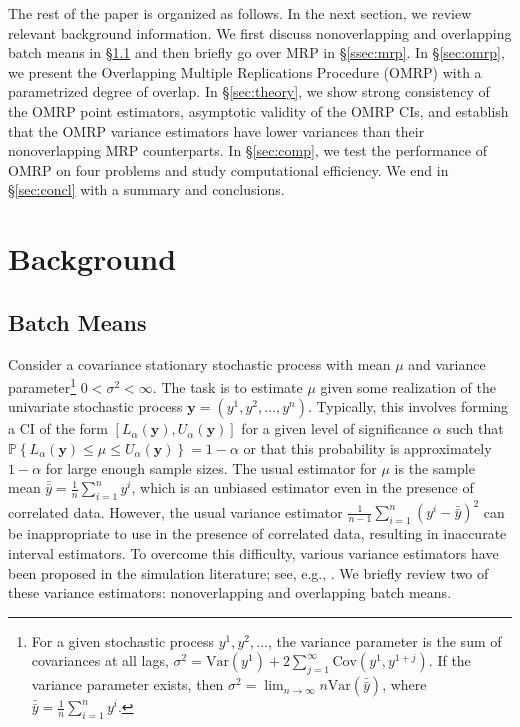 \documentclass[12pt]{article}
\newcommand{\p}[1]{\mathbb{P} \left\{ #1 \right\}}
\newcommand{\y}{\mathbf{y}}
\newcommand{\yb}{\bar{y}}
\newcommand{\ybb}{\bar{\yb}}
\begin{document}
The rest of the paper is organized as follows.  
In the next section, we review relevant background information.  
We first discuss nonoverlapping and overlapping batch means in \S \ref{ssec:obm} and then briefly go over MRP in \S \ref{ssec:mrp}.  
In \S \ref{sec:omrp}, we present the Overlapping Multiple Replications Procedure (OMRP) with a parametrized degree of overlap.  
In \S \ref{sec:theory}, we show strong consistency of the OMRP point estimators, asymptotic validity of the OMRP CIs, and establish that the OMRP variance estimators have lower variances than their nonoverlapping MRP counterparts.
In \S \ref{sec:comp}, we test the performance of OMRP on four problems and study computational efficiency. 
We end in \S \ref{sec:concl} with a summary and conclusions.


\section{Background}
\label{sec:background}


\subsection{Batch Means} 
\label{ssec:obm}

Consider a covariance stationary stochastic process with mean $\mu$ and variance parameter\footnote{For a given stochastic process $y^1, y^2, \dots$, the variance parameter is the sum of covariances at all lags, $\sigma^2=\mathrm{Var} \left(y^1 \right)+2\sum_{j=1}^{\infty}\mathrm{Cov} \left(y^1,y^{1+j}\right)$. If the variance parameter exists, then  $\sigma^2=\lim_{n\rightarrow \infty}n\mathrm{Var} \left(\ybb\right)$, where $\ybb=\frac{1}{n}\sum_{i=1}^{n} y^{i}$.} $0<\sigma^2<\infty$.  
The task is to estimate $\mu$ given some realization of the univariate stochastic process $\y = (y^1, y^2, \dots, y^n)$.  
Typically, this involves forming a CI of the form $[L_\alpha(\y), U_\alpha(\y)]$ for a given level of significance $\alpha$ such that $\p{L_\alpha(\y) \leq \mu \leq U_\alpha(\y)} = 1 - \alpha$ or that this probability is approximately $1 - \alpha$ for large enough sample sizes.  
The usual estimator for $\mu$ is the sample mean $\ybb = \frac{1}{n} \sum_{i=1}^n y^i$, which is an unbiased estimator even in the presence of correlated data.  
However, the usual variance estimator $\frac{1}{n-1} \sum_{i=1}^n (y^i - \ybb)^2$ can be inappropriate to use in the presence of correlated data, resulting in inaccurate interval estimators.  
To overcome this difficulty, various variance estimators have been proposed in the simulation literature; see, e.g., \citep{law_07}.  
We briefly review two of these variance estimators: nonoverlapping and overlapping batch means.
\end{document}
